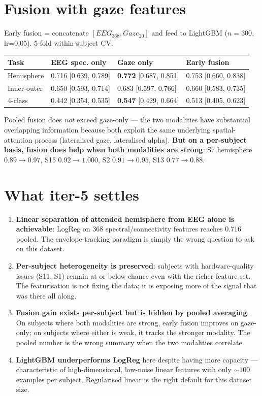 \section{Fusion with gaze features}

Early fusion = concatenate $[EEG_{368}, Gaze_{20}]$ and feed to
LightGBM ($n=300$, lr=0.05). 5-fold within-subject CV.

\begin{table}[ht]
\centering
\begin{tabular}{llll}
\toprule
Task & EEG spec. only & Gaze only & Early fusion \\
\midrule
Hemisphere  & 0.716 [0.639, 0.789] & \textbf{0.772} [0.687, 0.851] & 0.753 [0.660, 0.838] \\
Inner-outer & 0.650 [0.593, 0.714] & 0.683 [0.597, 0.766] & 0.660 [0.583, 0.735] \\
4-class     & 0.442 [0.354, 0.535] & \textbf{0.547} [0.429, 0.664] & 0.513 [0.405, 0.623] \\
\bottomrule
\end{tabular}
\end{table}

Pooled fusion does \emph{not} exceed gaze-only --- the two modalities
have substantial overlapping information because both exploit the
same underlying spatial-attention process (lateralised gaze, lateralised
alpha). \textbf{But on a per-subject basis, fusion does help when both
modalities are strong}: S7 hemisphere $0.89 \to 0.97$, S15 $0.92 \to
1.000$, S2 $0.91 \to 0.95$, S13 $0.77 \to 0.88$.

\section{What iter-5 settles}

\begin{enumerate}
  \item \textbf{Linear separation of attended hemisphere from EEG alone
        is achievable}: LogReg on 368 spectral/connectivity features
        reaches 0.716 pooled. The envelope-tracking paradigm is simply
        the wrong question to ask on this dataset.
  \item \textbf{Per-subject heterogeneity is preserved}: subjects with
        hardware-quality issues (S11, S1) remain at or below chance
        even with the richer feature set. The featurisation is not
        fixing the data; it is exposing more of the signal that was
        there all along.
  \item \textbf{Fusion gain exists per-subject but is hidden by pooled
        averaging}. On subjects where both modalities are strong, early
        fusion improves on gaze-only; on subjects where either is weak,
        it tracks the stronger modality. The pooled number is the wrong
        summary when the two modalities correlate.
  \item \textbf{LightGBM underperforms LogReg} here despite having more
        capacity --- characteristic of high-dimensional, low-noise
        linear features with only $\sim 100$ examples per subject.
        Regularised linear is the right default for this dataset size.
\end{enumerate}

